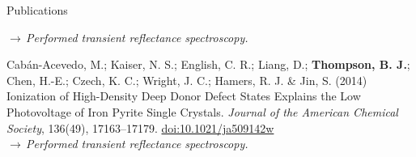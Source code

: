 \documentclass{resume}  %
\begin{document}
\begin{rSection}{Publications}
\begin{etaremune}[leftmargin = 1.75em]
      $\rightarrow\,$\textit{Performed transient reflectance spectroscopy.}
    \item Cabán-Acevedo, M.; Kaiser, N. S.; English, C. R.; Liang, D.; \textbf{Thompson, B. J.};
      Chen, H.-E.; Czech, K. C.; Wright, J. C.; Hamers, R. J. \& Jin, S.
      (2014)
      Ionization of High-Density Deep Donor Defect States Explains the Low
      Photovoltage of Iron Pyrite Single Crystals.
      \textit{Journal of the American Chemical Society}, 136(49), 17163–17179.
      \href{https://doi.org/10.1021/ja509142w}{doi:10.1021/ja509142w} \\
      $\rightarrow\,$\textit{Performed transient reflectance spectroscopy.}
  \end{etaremune}
\end{rSection}

\clearpage
\end{document}
